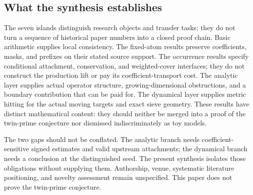 \subsection{What the synthesis establishes}
The seven islands distinguish research objects and transfer tasks; they do not turn a sequence of historical paper numbers into a closed proof chain.
Basic arithmetic supplies local consistency. The fixed-atom results preserve coefficients, masks, and prefixes on their stated source support. The occurrence results specify conditional attachment, conservation, and weighted-cover interfaces; they do not construct the production lift or pay its coefficient-transport cost. The analytic layer supplies actual operator structure, growing-dimensional obstructions, and a boundary contribution that can be paid for. The dynamical layer supplies metric hitting for the actual moving targets and exact sieve geometry.
These results have distinct mathematical content: they should neither be merged into a proof of the twin-prime conjecture nor dismissed indiscriminately as toy models.

The two gaps should not be conflated. The analytic branch needs coefficient-sensitive signed estimates and valid upstream attachments; the dynamical branch needs a conclusion at the distinguished seed. The present synthesis isolates those obligations without supplying them. Authorship, venue, systematic literature positioning, and novelty assessment remain unspecified. This paper does not prove the twin-prime conjecture.
